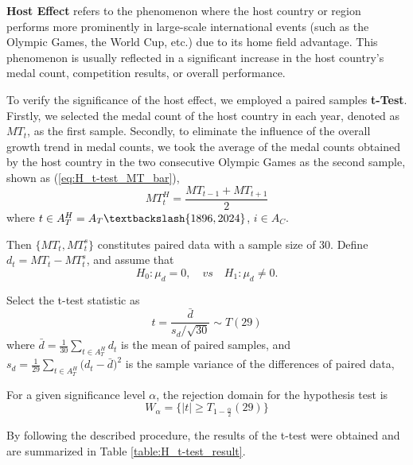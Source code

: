 \documentclass{mcmthesis}
\begin{document}
\textbf{Host Effect} refers to the phenomenon where the host country or region performs more prominently in large-scale international events (such as the Olympic Games, the World Cup, etc.) due to its home field advantage. This phenomenon is usually reflected in a significant increase in the host country's medal count, competition results, or overall performance. 


To verify the significance of the host effect, we employed a paired samples \textbf{t-Test}. Firstly, we selected the medal count of the host country in each year, denoted as $MT_{t}$, as the first sample. Secondly, to eliminate the influence of the overall growth trend in medal counts, we took the average of the medal counts obtained by the host country in the two consecutive Olympic Games as the second sample, shown as (\ref{eq:H_t-test_MT_bar}),
\begin{equation}
MT^H_{t}=\frac{ MT_{t-1} + MT_{t+1} }{2}
\label{eq:H_t-test_MT_bar}
\end{equation}
where $t\in A_T^H = A_T \textbackslash \{1896,2024\}$, $i\in A_{C}$. 

Then $\{MT_{t},MT^s_{t}\}$ constitutes paired data with a sample size of 30. Define $d_t= MT_{t} - MT^s_{t}$, and assume that
\begin{equation*}
H_0: \mu_d=0, \quad vs \quad H_1:  \mu_d \ne 0.
\end{equation*}

Select the t-test statistic as
\begin{equation}
t=\frac{ \bar{d} }{ s_d\slash \sqrt{30} } \sim T(29)
\end{equation}
where $\bar{d}=\frac{1}{30} \sum_{t\in A_T^H} d_t$ is the mean of paired samples, 
and $ s_d = \frac{1}{29} \sum_{t\in A_T^H}\big( d_t - \bar{d} \big)^2 $ is the sample variance of the differences of paired data, 

For a given significance level $\alpha$, the rejection domain for the hypothesis test is
\begin{equation}
W_\alpha = \big\{ |t| \ge T_{1-\frac{\alpha}{2}}(29) \big\}
\end{equation}

By following the described procedure, the results of the t-test were obtained and are summarized in Table \ref{table:H_t-test_result}.
\end{document}
